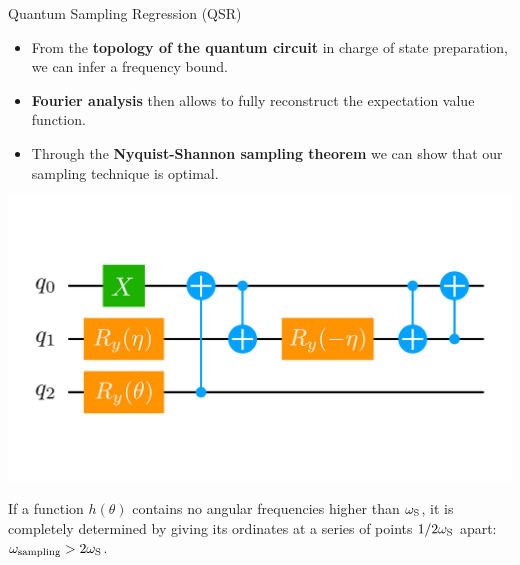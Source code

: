 \documentclass[9pt, handout, aspectratio=169]{beamer}	%
\begin{document}

\begin{frame}{Quantum Sampling Regression (QSR)}

	\begin{multicols}{2}

		\begin{itemize}
			\item From the \textbf{topology of the quantum circuit} in charge of state preparation, we can infer a frequency bound.
			\item \textbf{Fourier analysis} then allows to fully reconstruct the expectation value function.
			\item Through the \textbf{Nyquist-Shannon sampling theorem} we can show that our sampling technique is optimal.
		\end{itemize}

		\columnbreak

		\begin{center}
			\includegraphics[width=.40\paperwidth]{Figures/quantum-circuit}
		\end{center}

	\end{multicols}

	\vspace{-1em}
	\begin{theorem}
		If a function $h(\theta)$ contains no angular frequencies higher than $\omega_{\textnormal{S}}$, it is completely determined by giving its ordinates at a series of points $1/2\omega_{\textnormal{S}}$ apart: $\omega_{\textnormal{sampling}} > 2\omega_{\textnormal{S}}$.
	\end{theorem}

\end{frame}
\end{document}
